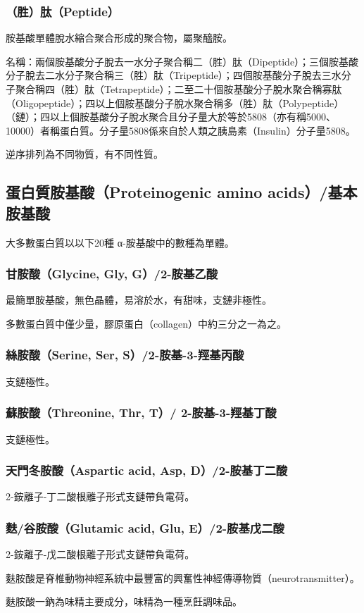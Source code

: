 \documentclass[a4paper,12pt]{report}
\begin{document}
\begin{itemize}
\begin{itemize}
\subsubsection{（胜）肽（Peptide）}
胺基酸單體脫水縮合聚合形成的聚合物，屬聚醯胺。

名稱：兩個胺基酸分子脫去一水分子聚合稱二（胜）肽（Dipeptide）；三個胺基酸分子脫去二水分子聚合稱三（胜）肽（Tripeptide）；四個胺基酸分子脫去三水分子聚合稱四（胜）肽（Tetrapeptide）；二至二十個胺基酸分子脫水聚合稱寡肽（Oligopeptide）；四以上個胺基酸分子脫水聚合稱多（胜）肽（Polypeptide）（鏈）；四以上個胺基酸分子脫水聚合且分子量大於等於5808（亦有稱5000、10000）者稱蛋白質。分子量5808係來自於人類之胰島素（Insulin）分子量5808。

逆序排列為不同物質，有不同性質。
\subsection{蛋白質胺基酸（Proteinogenic amino acids）/基本胺基酸}
大多數蛋白質以以下20種 α-胺基酸中的數種為單體。
\subsubsection{甘胺酸（Glycine, Gly, G）/2-胺基乙酸}
最簡單胺基酸，無色晶體，易溶於水，有甜味，支鏈非極性。

多數蛋白質中僅少量，膠原蛋白（collagen）中約三分之一為之。
\subsubsection{絲胺酸（Serine, Ser, S）/2-胺基-3-羥基丙酸}
支鏈極性。
\subsubsection{蘇胺酸（Threonine, Thr, T）/
2-胺基-3-羥基丁酸}
支鏈極性。
\subsubsection{天門冬胺酸（Aspartic acid, Asp, D）/2-胺基丁二酸}
2-銨離子-丁二酸根離子形式支鏈帶負電荷。
\subsubsection{麩/谷胺酸（Glutamic acid, Glu, E）/2-胺基戊二酸}
2-銨離子-戊二酸根離子形式支鏈帶負電荷。

麩胺酸是脊椎動物神經系統中最豐富的興奮性神經傳導物質（neurotransmitter）。

麩胺酸一鈉為味精主要成分，味精為一種烹飪調味品。

\end{itemize}
\end{itemize}
\end{document}
